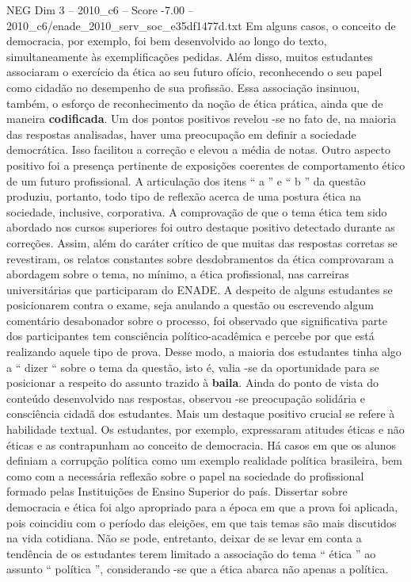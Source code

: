 \begin{textsample}{NEG Dim 3 – 2010\_c6 – Score -7.00 – 2010\_c6/enade\_2010\_serv\_soc\_e35df1477d.txt}
Em alguns casos, o conceito de democracia, por exemplo, foi bem desenvolvido ao longo do texto, simultaneamente às exemplificações pedidas.
Além disso, muitos estudantes associaram o exercício da ética ao seu futuro ofício, reconhecendo o seu papel como cidadão no desempenho de sua profissão.
Essa associação insinuou, também, o esforço de reconhecimento da noção de ética prática, ainda que de maneira \textbf{codificada}.
Um dos pontos positivos revelou -se no fato de, na maioria das respostas analisadas, haver uma preocupação em definir a sociedade democrática.
Isso facilitou a correção e elevou a média de notas.
Outro aspecto positivo foi a presença pertinente de exposições coerentes de comportamento ético de um futuro profissional.
A articulação dos itens “ a ” e “ b ” da questão produziu, portanto, todo tipo de reflexão acerca de uma postura ética na sociedade, inclusive, corporativa.
A comprovação de que o tema ética tem sido abordado nos cursos superiores foi outro destaque positivo detectado durante as correções.
Assim, além do caráter crítico de que muitas das respostas corretas se revestiram, os relatos constantes sobre desdobramentos da ética comprovaram a abordagem sobre o tema, no mínimo, a ética profissional, nas carreiras universitárias que participaram do ENADE.
A despeito de alguns estudantes se posicionarem contra o exame, seja anulando a questão ou escrevendo algum comentário desabonador sobre o processo, foi observado que significativa parte dos participantes tem consciência político-acadêmica e percebe por que está realizando aquele tipo de prova.
Desse modo, a maioria dos estudantes tinha algo a “ dizer “ sobre o tema da questão, isto é, valia -se da oportunidade para se posicionar a respeito do assunto trazido à \textbf{baila}.
Ainda do ponto de vista do conteúdo desenvolvido nas respostas, observou -se preocupação solidária e consciência cidadã dos estudantes.
Mais um destaque positivo crucial se refere à habilidade textual.
Os estudantes, por exemplo, expressaram atitudes éticas e não éticas e as contrapunham ao conceito de democracia.
Há casos em que os alunos definiam a corrupção política como um exemplo realidade política brasileira, bem como com a necessária reflexão sobre o papel na sociedade do profissional formado pelas Instituições de Ensino Superior do país.
Dissertar sobre democracia e ética foi algo apropriado para a época em que a prova foi aplicada, pois coincidiu com o período das eleições, em que tais temas são mais discutidos na vida cotidiana.
Não se pode, entretanto, deixar de se levar em conta a tendência de os estudantes terem limitado a associação do tema “ ética ” ao assunto “ política ”, considerando -se que a ética abarca não apenas a política.

\end{textsample}
